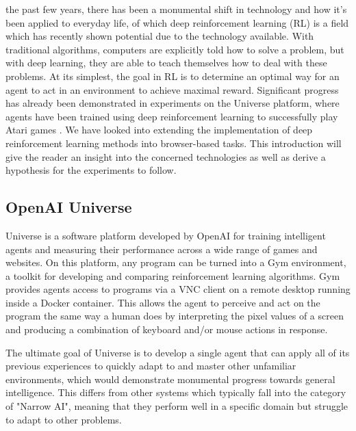 \documentclass[10pt,journal,compsoc]{IEEEtran}
\begin{document}
% 
% 
% 
% 
 the past few years, there has been a monumental shift in technology and how it's been applied to everyday life, of which deep reinforcement learning (RL) is a field which has recently shown potential due to the technology available. With traditional algorithms, computers are explicitly told how to solve a problem, but with deep learning, they are able to teach themselves how to deal with these problems. At its simplest, the goal in RL is to determine an optimal way for an agent to act in an environment to achieve maximal reward. Significant progress has already been demonstrated in experiments on the Universe platform, where agents have been trained using deep reinforcement learning to successfully play Atari games \cite{mnih2013playing}. We have looked into extending the implementation of deep reinforcement learning methods into browser-based tasks. This introduction will give the reader an insight into the concerned technologies as well as derive a hypothesis for the experiments to follow.

\subsection{OpenAI Universe}
Universe is a software platform developed by OpenAI for training intelligent agents and measuring their performance across a wide range of games and websites. On this platform, any program can be turned into a Gym environment, a toolkit for developing and comparing reinforcement learning algorithms. Gym provides agents access to programs via a VNC client on a remote desktop running inside a Docker container. This allows the agent to perceive and act on the program the same way a human does by interpreting the pixel values of a screen and producing a combination of keyboard and/or mouse actions in response.

The ultimate goal of Universe is to develop a single agent that can apply all of its previous experiences to quickly adapt to and master other unfamiliar environments, which would demonstrate monumental progress towards general intelligence. This differs from other systems which typically fall into the category of "Narrow AI", meaning that they perform well in a specific domain but struggle to adapt to other problems.
\end{document}
